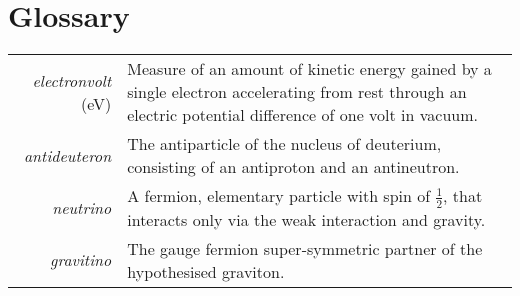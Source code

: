 \chapter*{Glossary} 

\begin{center}
    \begin{longtable}{r p{}}
    \textit{electronvolt} (eV) & Measure of an amount of kinetic energy gained by a single electron accelerating from rest through an electric potential difference of one volt in vacuum.\\
    
    \textit{antideuteron} & The antiparticle of the nucleus of deuterium, consisting of an antiproton and an antineutron.\\
    
    \textit{neutrino} &  A fermion, elementary particle with spin of $\frac{1}{2}$, that interacts only via the weak interaction and gravity.\\
    
    \textit{gravitino} & The gauge fermion super-symmetric partner of the hypothesised graviton.
    
    \end{longtable}
\end{center}
